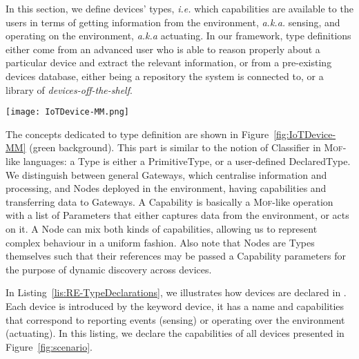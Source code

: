 In this section, we define \IOT devices' types, \textit{i.e.} which capabilities are available to the users in terms of getting information from the environment, \textit{a.k.a.} sensing, and operating on the environment, \textit{a.k.a} actuating. In our framework, type definitions either come from an advanced user who is able to reason properly about a particular device and extract the relevant information, or from a pre-existing devices database, either being a repository the system is connected to, or a library of \textit{devices-off-the-shelf}. 

\begin{figure*}%
  \centering  
  \texttt{[image: IoTDevice-MM.png]}%
  \caption{Metamodel of \IOTDSL, separated in three concerns: \emph{Type Definition} captures devices' capabilities (top green part), \emph{Network Configuration} details how device instances are connected to each others (middle purple part), \emph{Business Rules} defines the functionalities expected from the IoT installation (bottom yellow part).}%
  \label{fig:IoTDevice-MM}%
\end{figure*}

The concepts dedicated to type definition are shown in Figure~\ref{fig:IoTDevice-MM} (green background). This part is similar to the notion of \textsf{Classifier} in \textsc{Mof}-like languages: a \textsf{Type} is either a \textsf{PrimitiveType}, or a user-defined \textsf{DeclaredType}. We distinguish between general \textsf{Gateway}s, which centralise information and processing, and \textsf{Node}s deployed in the environment, having capabilities and transferring data to \textsf{Gateway}s. A \textsf{Capability} is basically a \textsc{Mof}-like operation with a list of \textsf{Parameter}s that either captures data from the environment, or acts on it. A \textsf{Node} can mix both kinds of capabilities, allowing us to represent complex behaviour in a uniform fashion. Also note that \textsf{Node}s are \textsf{Type}s themselves such that their references may be passed a \textsf{Capability} parameters for the purpose of dynamic discovery across devices.


In Listing~\ref{lis:RE-TypeDeclarations}, we illustrates how devices are declared in \IOTDSL. Each device is introduced by the keyword \textsf{device}, it has a name and capabilities that correspond to reporting events (\textsf{sensing}) or operating over the environment (\textsf{actuating}). In this listing, we declare the capabilities of all devices presented in Figure~\ref{fig:scenario}.

